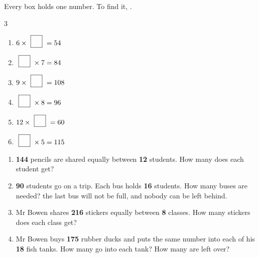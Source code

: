 \documentclass[12pt,a4paper]{article}
\newcommand{\nbox}{\ \fbox{\rule{0pt}{1.05em}\rule{1.0em}{0pt}}\ }
\begin{document}

\noindent Every box holds one number. To find it, .

\vspace{4pt}
\begin{multicols}{3}
\begin{enumerate}[label=(\alph*), itemsep=12pt]
  \item $6 \times \nbox = 54$
  \item $\nbox \times 7 = 84$
  \item $9 \times \nbox = 108$
  \item $\nbox \times 8 = 96$
  \item $12 \times \nbox = 60$
  \item $\nbox \times 5 = 115$
\end{enumerate}
\end{multicols}


\begin{enumerate}[label=\textbf{\arabic*.}, itemsep=10pt]
  \item \textbf{144} pencils are shared equally between \textbf{12} students. How
        many does each student get?
        \begin{workspace}[2.0cm]\end{workspace}
  \item \textbf{90} students go on a trip. Each bus holds \textbf{16} students.
        How many buses are needed? \;  the last bus will not be full,
        and nobody can be left behind.
        \begin{workspace}[2.2cm]\end{workspace}
  \item Mr Bowen shares \textbf{216} stickers equally between \textbf{8} classes.
        How many stickers does each class get?
        \begin{workspace}[2.2cm]\end{workspace}
  \item Mr Bowen buys \textbf{175} rubber ducks and puts the same number into each
        of his \textbf{18} fish tanks. How many go into each tank? How many are
        left over?
        \begin{workspace}[2.4cm]\end{workspace}
\end{enumerate}
\end{document}
